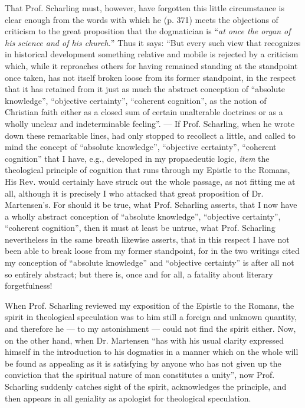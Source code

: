\documentclass[12pt,a4paper,openany]{book}
\newcommand{\opage}[1]{\marginnote{\footnotesize\textit{[#1]}}}
\begin{document}
\setcounter{footnote}{0}%
\opage{18}That Prof. Scharling must, however, have forgotten this
little circumstance is clear enough from the words with which he
(p. 371) meets the objections of criticism to the
great proposition that the dogmatician is ``\emph{at once the organ of his}
\emph{science and of his church.}'' Thus it
says: ``But every such view that recognizes in
historical development something relative and mobile
is rejected by a criticism which, while it reproaches
others for having remained standing at the
standpoint once taken, has not itself broken loose
from its former standpoint, in the respect that it has
retained from it just as much the abstract conception of
``absolute knowledge'', ``objective certainty'', ``coherent cognition'', as the notion of Christian faith
either as a closed sum of certain unalterable
doctrines or as a wholly unclear and indeterminable
feeling''. --- If Prof. Scharling, when he wrote down
these remarkable lines, had only stopped to recollect a little,
and called to mind the concept of ``absolute knowledge'',
``objective certainty'', ``coherent cognition'' that I have, e.g.,
developed in my propaedeutic logic, \textit{item} the theological
principle of cognition that runs through my Epistle to the Romans,
His Rev. would certainly have struck out the whole
passage, as not fitting me at all, although it
is precisely I who attacked that great proposition
of Dr. Martensen's. For should it be true, what
\setcounter{footnote}{0}%
\opage{19}Prof. Scharling asserts, that I now have a wholly abstract
conception of ``absolute knowledge'', ``objective certainty'', %
``coherent cognition'', then it must at
least be untrue, what Prof. Scharling nevertheless in the same
breath likewise asserts, that in this respect I
have not been able to break loose from my former standpoint,
for in the two writings cited my conception of ``absolute
knowledge'' and ``objective certainty'' is after all not so entirely
abstract; but there is, once and for all, a fatality about
literary forgetfulness!

When Prof. Scharling reviewed my exposition
of the Epistle to the Romans, the spirit in theological speculation
was to him still a foreign and unknown quantity,
and therefore he --- to my astonishment ---
could not find the spirit either. Now, on the other hand, when Dr.
Martensen ``has with his usual clarity expressed himself in the introduction
to his dogmatics in a manner which on the
whole will be found as appealing as it is satisfying by
anyone who has not given up the conviction that the
spiritual nature of man constitutes a unity'', now
Prof. Scharling suddenly catches sight of the spirit, acknowledges
the principle, and then appears in all geniality as apologist
for theological speculation.
\end{document}
